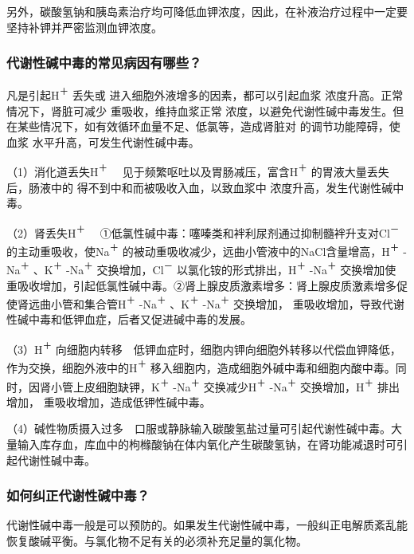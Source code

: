 另外，碳酸氢钠和胰岛素治疗均可降低血钾浓度，因此，在补液治疗过程中一定要坚持补钾并严密监测血钾浓度。

\subsubsection{代谢性碱中毒的常见病因有哪些？}

凡是引起H\textsuperscript{＋}
丢失或
进入细胞外液增多的因素，都可以引起血浆
浓度升高。正常情况下，肾脏可减少
重吸收，维持血浆正常
浓度，以避免代谢性碱中毒发生。但在某些情况下，如有效循环血量不足、低氯等，造成肾脏对
的调节功能障碍，使血浆
水平升高，可发生代谢性碱中毒。

（1）消化道丢失H\textsuperscript{＋}
　见于频繁呕吐以及胃肠减压，富含H\textsuperscript{＋}
的胃液大量丢失后，肠液中的
得不到中和而被吸收入血，以致血浆中
浓度升高，发生代谢性碱中毒。

（2）肾丢失H\textsuperscript{＋}
　①低氯性碱中毒：噻嗪类和袢利尿剂通过抑制髓袢升支对Cl\textsuperscript{－}
的主动重吸收，使Na\textsuperscript{＋}
的被动重吸收减少，远曲小管液中的NaCl含量增高，H\textsuperscript{＋}
-Na\textsuperscript{＋} 、K\textsuperscript{＋} -Na\textsuperscript{＋}
交换增加，Cl\textsuperscript{－}
以氯化铵的形式排出，H\textsuperscript{＋} -Na\textsuperscript{＋}
交换增加使
重吸收增加，引起低氯性碱中毒。②肾上腺皮质激素增多：肾上腺皮质激素增多促使肾远曲小管和集合管H\textsuperscript{＋}
-Na\textsuperscript{＋} 、K\textsuperscript{＋} -Na\textsuperscript{＋}
交换增加，
重吸收增加，导致代谢性碱中毒和低钾血症，后者又促进碱中毒的发展。

（3）H\textsuperscript{＋}
向细胞内转移　低钾血症时，细胞内钾向细胞外转移以代偿血钾降低，作为交换，细胞外液中的H\textsuperscript{＋}
移入细胞内，造成细胞外碱中毒和细胞内酸中毒。同时，因肾小管上皮细胞缺钾，K\textsuperscript{＋}
-Na\textsuperscript{＋} 交换减少H\textsuperscript{＋}
-Na\textsuperscript{＋} 交换增加，H\textsuperscript{＋}
排出增加，
重吸收增加，造成低钾性碱中毒。

（4）碱性物质摄入过多　口服或静脉输入碳酸氢盐过量可引起代谢性碱中毒。大量输入库存血，库血中的枸橼酸钠在体内氧化产生碳酸氢钠，在肾功能减退时可引起代谢性碱中毒。

\subsubsection{如何纠正代谢性碱中毒？}

代谢性碱中毒一般是可以预防的。如果发生代谢性碱中毒，一般纠正电解质紊乱能恢复酸碱平衡。与氯化物不足有关的必须补充足量的氯化物。

